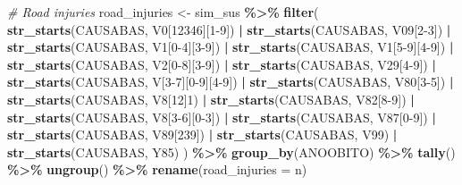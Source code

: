 \documentclass[
]{article}
\newenvironment{Shaded}{\begin{snugshade}}{\end{snugshade}}
\newcommand{\AttributeTok}[1]{\textcolor[rgb]{0.13,0.29,0.53}{#1}}
\newcommand{\CommentTok}[1]{\textcolor[rgb]{0.56,0.35,0.01}{\textit{#1}}}
\newcommand{\FunctionTok}[1]{\textcolor[rgb]{0.13,0.29,0.53}{\textbf{#1}}}
\newcommand{\NormalTok}[1]{#1}
\newcommand{\OtherTok}[1]{\textcolor[rgb]{0.56,0.35,0.01}{#1}}
\newcommand{\SpecialCharTok}[1]{\textcolor[rgb]{0.81,0.36,0.00}{\textbf{#1}}}
\newcommand{\StringTok}[1]{\textcolor[rgb]{0.31,0.60,0.02}{#1}}
\begin{document}
\begin{Shaded}
\begin{Highlighting}[]
\CommentTok{\# Road injuries}
\NormalTok{road\_injuries }\OtherTok{\textless{}{-}}
\NormalTok{  sim\_sus }\SpecialCharTok{\%\textgreater{}\%}
  \FunctionTok{filter}\NormalTok{(}
    \FunctionTok{str\_starts}\NormalTok{(CAUSABAS, }\StringTok{\textquotesingle{}V0[12346][1{-}9]\textquotesingle{}}\NormalTok{) }\SpecialCharTok{|} \FunctionTok{str\_starts}\NormalTok{(CAUSABAS, }\StringTok{\textquotesingle{}V09[2{-}3]\textquotesingle{}}\NormalTok{) }\SpecialCharTok{|}
    \FunctionTok{str\_starts}\NormalTok{(CAUSABAS, }\StringTok{\textquotesingle{}V1[0{-}4][3{-}9]\textquotesingle{}}\NormalTok{) }\SpecialCharTok{|} \FunctionTok{str\_starts}\NormalTok{(CAUSABAS, }\StringTok{\textquotesingle{}V1[5{-}9][4{-}9]\textquotesingle{}}\NormalTok{) }\SpecialCharTok{|}
    \FunctionTok{str\_starts}\NormalTok{(CAUSABAS, }\StringTok{\textquotesingle{}V2[0{-}8][3{-}9]\textquotesingle{}}\NormalTok{) }\SpecialCharTok{|} \FunctionTok{str\_starts}\NormalTok{(CAUSABAS, }\StringTok{\textquotesingle{}V29[4{-}9]\textquotesingle{}}\NormalTok{) }\SpecialCharTok{|}
    \FunctionTok{str\_starts}\NormalTok{(CAUSABAS, }\StringTok{\textquotesingle{}V[3{-}7][0{-}9][4{-}9]\textquotesingle{}}\NormalTok{) }\SpecialCharTok{|}
    \FunctionTok{str\_starts}\NormalTok{(CAUSABAS, }\StringTok{\textquotesingle{}V80[3{-}5]\textquotesingle{}}\NormalTok{) }\SpecialCharTok{|} \FunctionTok{str\_starts}\NormalTok{(CAUSABAS, }\StringTok{\textquotesingle{}V8[12]1\textquotesingle{}}\NormalTok{) }\SpecialCharTok{|}
    \FunctionTok{str\_starts}\NormalTok{(CAUSABAS, }\StringTok{\textquotesingle{}V82[8{-}9]\textquotesingle{}}\NormalTok{) }\SpecialCharTok{|} \FunctionTok{str\_starts}\NormalTok{(CAUSABAS, }\StringTok{\textquotesingle{}V8[3{-}6][0{-}3]\textquotesingle{}}\NormalTok{) }\SpecialCharTok{|}
    \FunctionTok{str\_starts}\NormalTok{(CAUSABAS, }\StringTok{\textquotesingle{}V87[0{-}9]\textquotesingle{}}\NormalTok{) }\SpecialCharTok{|} \FunctionTok{str\_starts}\NormalTok{(CAUSABAS, }\StringTok{\textquotesingle{}V89[239]\textquotesingle{}}\NormalTok{) }\SpecialCharTok{|}
    \FunctionTok{str\_starts}\NormalTok{(CAUSABAS, }\StringTok{\textquotesingle{}V99\textquotesingle{}}\NormalTok{) }\SpecialCharTok{|} \FunctionTok{str\_starts}\NormalTok{(CAUSABAS, }\StringTok{\textquotesingle{}Y85\textquotesingle{}}\NormalTok{)}
\NormalTok{  ) }\SpecialCharTok{\%\textgreater{}\%}
  \FunctionTok{group\_by}\NormalTok{(ANOOBITO) }\SpecialCharTok{\%\textgreater{}\%}
  \FunctionTok{tally}\NormalTok{() }\SpecialCharTok{\%\textgreater{}\%}
  \FunctionTok{ungroup}\NormalTok{() }\SpecialCharTok{\%\textgreater{}\%}
  \FunctionTok{rename}\NormalTok{(}\AttributeTok{road\_injuries =}\NormalTok{ n)}
\end{Highlighting}
\end{Shaded}
\end{document}
